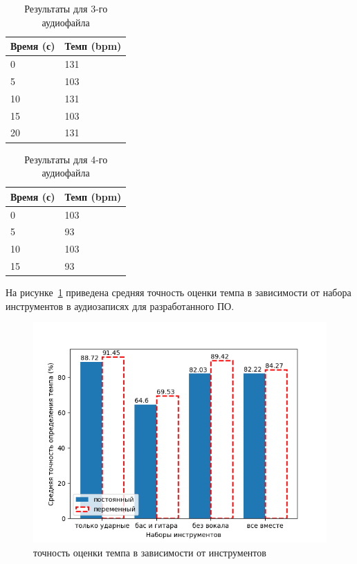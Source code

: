 \begin{table}[!h]
	\begin{center}
		\caption{\label{tab:soad_minus}Результаты для 3-го аудиофайла}
		\begin{tabular}{|p{8cm}|p{8cm}|}
			\hline
			Время (с) & Темп (bpm)\\
			\hline
			0 & 131\\
			\hline
			5 & 103\\
			\hline
			10 & 131\\
			\hline
			15 & 103\\
			\hline
			20 & 131\\
			\hline
		\end{tabular}
	\end{center}
\end{table}

\begin{table}[!h]
	\begin{center}
		\caption{\label{tab:soad_full}Результаты для 4-го аудиофайла}
		\begin{tabular}{|p{8cm}|p{8cm}|}
			\hline
			Время (с) & Темп (bpm)\\
			\hline
			0 & 103\\
			\hline
			5 & 93\\
			\hline
			10 & 103\\
			\hline
			15 & 93\\
			\hline
		\end{tabular}
	\end{center}
\end{table}

\newpage

На рисунке~\ref{img:tempo_instr} приведена средняя точность оценки темпа в зависимости от набора инструментов в аудиозаписях для разработанного ПО.

\begin{figure}[h]
	\centering
	\includegraphics[scale=1]{../graphs/tempo_instr.png}
	\caption{точность оценки темпа в зависимости от инструментов}
	\label{img:tempo_instr}
\end{figure}

